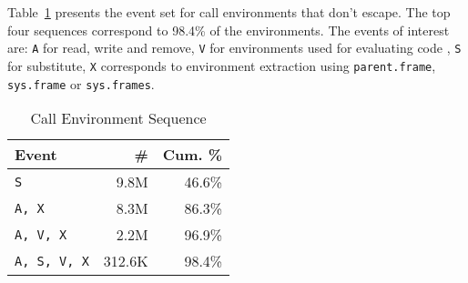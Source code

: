 \documentclass[10pt,review,sigplan,anonymous=true,authorversion=true,nonacm=true]{acmart}
\newcommand{\code}[1]{\lstinline |#1|\xspace}
\begin{document}
Table~\ref{table:call_env_seq} presents the event set for call environments that
don't escape. The top four sequences correspond to 98.4\% of the environments.
The events of interest are: \texttt{A} for read, write and remove, \texttt{V}
for environments used for evaluating code , \texttt{S} for substitute,
\texttt{X} corresponds to environment extraction using \code{parent.frame},
\code{sys.frame} or \code{sys.frames}.

\begin{table}[!h]
  \vspace{-3mm}
  \small
  \caption{Call Environment Sequence} \label{table:call_env_seq}
  \centering
  \begin{tabular}{lrr}
    \toprule
    \textbf{Event}&\textbf{\#}&\textbf{Cum. \%}\\
    \midrule
    \texttt{S}&9.8M&46.6\%\\
    \texttt{A, X}&8.3M&86.3\%\\
    \texttt{A, V, X}&2.2M&96.9\%\\
    \texttt{A, S, V, X}&312.6K&98.4\%\\
    \bottomrule
  \end{tabular}
\end{table}
\end{document}
